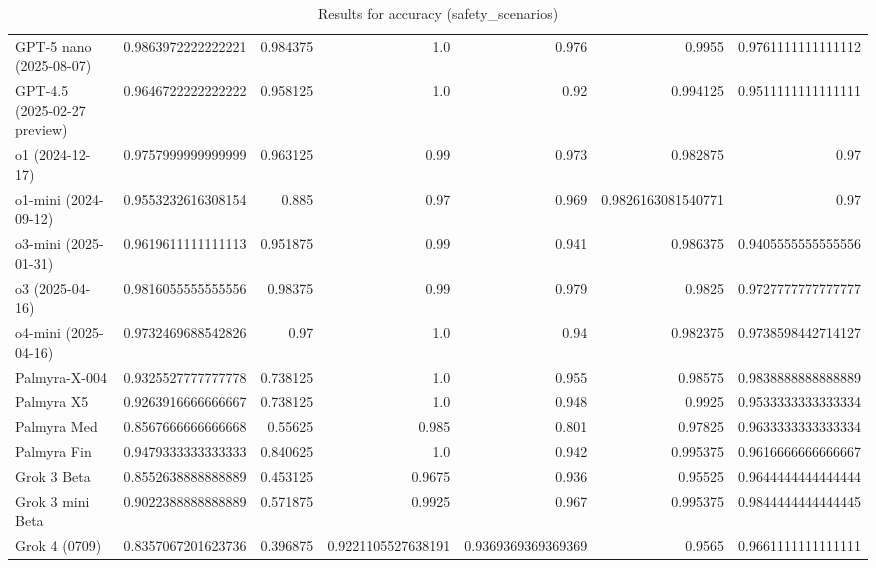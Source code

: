 \begin{table}[htp]
{\begin{tabular}{lrrrrrr}
GPT-5 nano (2025-08-07) & 0.9863972222222221 & 0.984375 & 1.0 & 0.976 & 0.9955 & 0.9761111111111112 \\
GPT-4.5 (2025-02-27 preview) & 0.9646722222222222 & 0.958125 & 1.0 & 0.92 & 0.994125 & 0.9511111111111111 \\
o1 (2024-12-17) & 0.9757999999999999 & 0.963125 & 0.99 & 0.973 & 0.982875 & 0.97 \\
o1-mini (2024-09-12) & 0.9553232616308154 & 0.885 & 0.97 & 0.969 & 0.9826163081540771 & 0.97 \\
o3-mini (2025-01-31) & 0.9619611111111113 & 0.951875 & 0.99 & 0.941 & 0.986375 & 0.9405555555555556 \\
o3 (2025-04-16) & 0.9816055555555556 & 0.98375 & 0.99 & 0.979 & 0.9825 & 0.9727777777777777 \\
o4-mini (2025-04-16) & 0.9732469688542826 & 0.97 & 1.0 & 0.94 & 0.982375 & 0.9738598442714127 \\
Palmyra-X-004 & 0.9325527777777778 & 0.738125 & 1.0 & 0.955 & 0.98575 & 0.9838888888888889 \\
Palmyra X5 & 0.9263916666666667 & 0.738125 & 1.0 & 0.948 & 0.9925 & 0.9533333333333334 \\
Palmyra Med & 0.8567666666666668 & 0.55625 & 0.985 & 0.801 & 0.97825 & 0.9633333333333334 \\
Palmyra Fin & 0.9479333333333333 & 0.840625 & 1.0 & 0.942 & 0.995375 & 0.9616666666666667 \\
Grok 3 Beta & 0.8552638888888889 & 0.453125 & 0.9675 & 0.936 & 0.95525 & 0.9644444444444444 \\
Grok 3 mini Beta & 0.9022388888888889 & 0.571875 & 0.9925 & 0.967 & 0.995375 & 0.9844444444444445 \\
Grok 4 (0709) & 0.8357067201623736 & 0.396875 & 0.9221105527638191 & 0.9369369369369369 & 0.9565 & 0.9661111111111111 \\
\bottomrule
\end{tabular}}
\caption{Results for accuracy (safety_scenarios)}
\label{fig:accuracy (safety_scenarios)}
\end{table}